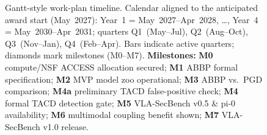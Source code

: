 \begin{figure}[t]
{%
}
\caption{Gantt-style work-plan timeline. Calendar aligned to the anticipated award start (May~2027): Year~1 = May~2027--Apr~2028, \ldots, Year~4 = May~2030--Apr~2031; quarters Q1~(May--Jul), Q2~(Aug--Oct), Q3~(Nov--Jan), Q4~(Feb--Apr). Bars indicate active quarters; diamonds mark milestones (M0--M7). {\footnotesize\textbf{Milestones:} \textbf{M0} compute/NSF ACCESS allocation secured; \textbf{M1} ABBP formal specification; \textbf{M2} MVP model zoo operational; \textbf{M3} ABBP vs.\ PGD comparison; \textbf{M4a} preliminary TACD false-positive check; \textbf{M4} formal TACD detection gate; \textbf{M5} VLA-SecBench v0.5 \& pi-0 availability; \textbf{M6} multimodal coupling benefit shown; \textbf{M7} VLA-SecBench v1.0 release.}}
\label{fig:workplan_timeline}
\end{figure}





